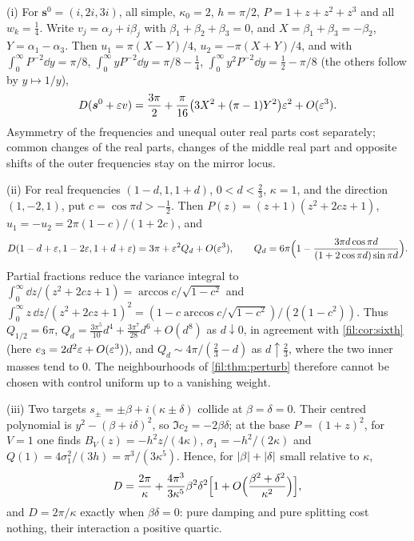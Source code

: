 \begin{example}\label{fil:ex:mirror}
(i) For $\boldsymbol s^0=(i,2i,3i)$, all simple, $\kappa_0=2$, $h=\pi/2$, $P=1+z+z^2+z^3$ and all $w_k=\tfrac14$. Write
$v_j=\alpha_j+i\beta_j$ with $\beta_1+\beta_2+\beta_3=0$, and $X=\beta_1+\beta_3=-\beta_2$, $Y=\alpha_1-\alpha_3$. Then
$u_1=\pi(X-Y)/4$, $u_2=-\pi(X+Y)/4$, and with $\int_0^\infty P^{-2}\dd y=\pi/8$,
$\int_0^\infty yP^{-2}\dd y=\pi/8-\tfrac14$, $\int_0^\infty y^2P^{-2}\dd y=\tfrac12-\pi/8$ (the others follow by $y\mapsto1/y$),
\[
 D(\boldsymbol s^0+\varepsilon v)=\frac{3\pi}2+\frac\pi{16}\bigl(3X^2+(\pi-1)Y^2\bigr)\varepsilon^2+O(\varepsilon^3).
\]
Asymmetry of the frequencies and unequal outer real parts cost separately; common changes of the real parts,
changes of the middle real part and opposite shifts of the outer frequencies stay on the mirror locus.

(ii) For real frequencies $(1-d,1,1+d)$, $0<d<\tfrac23$, $\kappa=1$, and the direction $(1,-2,1)$, put $c=\cos\pi d>-\tfrac12$.
Then $P(z)=(z+1)(z^2+2cz+1)$, $u_1=-u_2=2\pi(1-c)/(1+2c)$, and
\[
 D(1-d+\varepsilon,1-2\varepsilon,1+d+\varepsilon)=3\pi+\varepsilon^2Q_d+O(\varepsilon^3),\qquad
 Q_d=6\pi\Bigl(1-\frac{3\pi d\cos\pi d}{(1+2\cos\pi d)\sin\pi d}\Bigr).
\]
Partial fractions reduce the variance integral to $\int_0^\infty\dd z/(z^2+2cz+1)=\arccos c/\sqrt{1-c^2}$ and
$\int_0^\infty z\,\dd z/(z^2+2cz+1)^2=(1-c\arccos c/\sqrt{1-c^2})/(2(1-c^2))$. Thus $Q_{1/2}=6\pi$,
$Q_d=\tfrac{3\pi^5}{10}d^4+\tfrac{3\pi^7}{28}d^6+O(d^8)$ as $d\downarrow0$, in agreement with \cref{fil:cor:sixth} (here
$e_3=2d^2\varepsilon+O(\varepsilon^3)$), and $Q_d\sim4\pi/(\tfrac23-d)$ as $d\uparrow\tfrac23$, where the two inner masses tend to $0$. The
neighbourhoods of \cref{fil:thm:perturb} therefore cannot be chosen with control uniform up to a vanishing weight.

(iii) Two targets $s_\pm=\pm\beta+i(\kappa\pm\delta)$ collide at $\beta=\delta=0$. Their centred polynomial is
$y^2-(\beta+i\delta)^2$, so $\Im c_2=-2\beta\delta$; at the base $P=(1+z)^2$, for $V=1$ one finds $B_V(z)=-h^2z/(4\kappa)$,
$\sigma_1=-h^2/(2\kappa)$ and $Q(1)=4\sigma_1^2/(3h)=\pi^3/(3\kappa^5)$. Hence, for $\lvert\beta\rvert+\lvert\delta\rvert$ small relative to $\kappa$,
\[
 D=\frac{2\pi}\kappa+\frac{4\pi^3}{3\kappa^5}\beta^2\delta^2\Bigl[1+O\Bigl(\frac{\beta^2+\delta^2}{\kappa^2}\Bigr)\Bigr],
\]
and $D=2\pi/\kappa$ exactly when $\beta\delta=0$: pure damping and pure splitting cost nothing, their interaction a
positive quartic.


\end{example}
